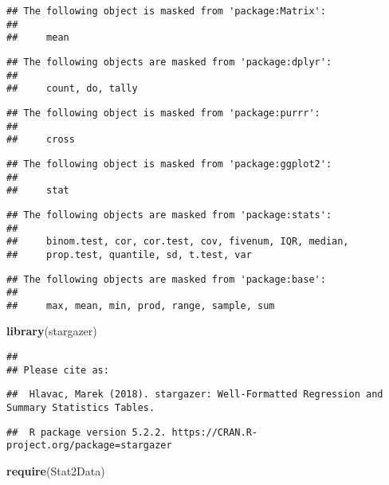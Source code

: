 \documentclass[]{article}
\newenvironment{Shaded}{\begin{snugshade}}{\end{snugshade}}
\newcommand{\KeywordTok}[1]{\textcolor[rgb]{0.13,0.29,0.53}{\textbf{#1}}}
\newcommand{\NormalTok}[1]{#1}
\begin{document}
\begin{verbatim}
## The following object is masked from 'package:Matrix':
## 
##     mean
\end{verbatim}

\begin{verbatim}
## The following objects are masked from 'package:dplyr':
## 
##     count, do, tally
\end{verbatim}

\begin{verbatim}
## The following object is masked from 'package:purrr':
## 
##     cross
\end{verbatim}

\begin{verbatim}
## The following object is masked from 'package:ggplot2':
## 
##     stat
\end{verbatim}

\begin{verbatim}
## The following objects are masked from 'package:stats':
## 
##     binom.test, cor, cor.test, cov, fivenum, IQR, median,
##     prop.test, quantile, sd, t.test, var
\end{verbatim}

\begin{verbatim}
## The following objects are masked from 'package:base':
## 
##     max, mean, min, prod, range, sample, sum
\end{verbatim}

\begin{Shaded}
\begin{Highlighting}[]
\KeywordTok{library}\NormalTok{(stargazer)}
\end{Highlighting}
\end{Shaded}

\begin{verbatim}
## 
## Please cite as:
\end{verbatim}

\begin{verbatim}
##  Hlavac, Marek (2018). stargazer: Well-Formatted Regression and Summary Statistics Tables.
\end{verbatim}

\begin{verbatim}
##  R package version 5.2.2. https://CRAN.R-project.org/package=stargazer
\end{verbatim}

\begin{Shaded}
\begin{Highlighting}[]
\KeywordTok{require}\NormalTok{(Stat2Data)}
\end{Highlighting}
\end{Shaded}
\end{document}
